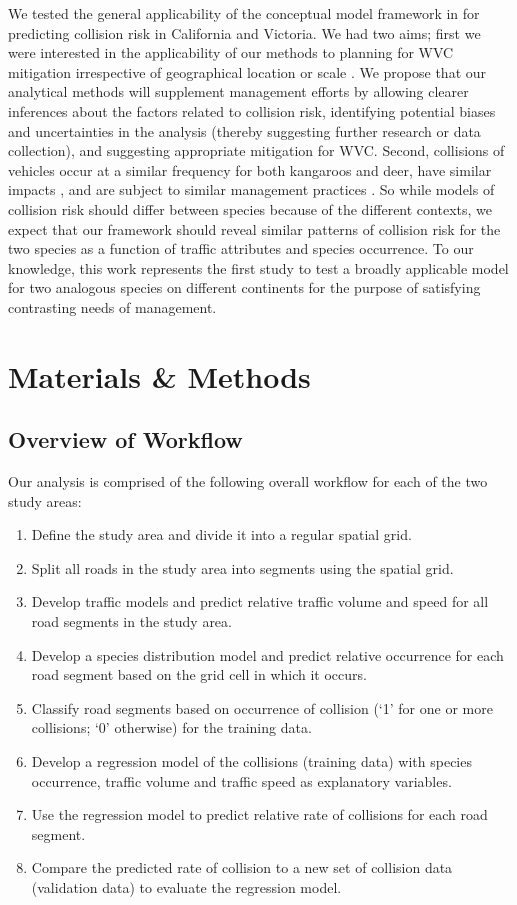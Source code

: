 We tested the general applicability of the conceptual model framework in  for predicting collision risk in California and Victoria.  We had two aims; first we were interested in the applicability of our methods to planning for WVC mitigation irrespective of geographical location or scale \citep[see][]{rvdr11}.  We propose that our analytical methods will supplement management efforts by allowing clearer inferences about the factors related to collision risk, identifying potential biases and uncertainties in the analysis (thereby suggesting further research or data collection), and suggesting appropriate mitigation for WVC.  Second, collisions of vehicles occur at a similar frequency for both kangaroos and deer, have similar impacts \citep{lang08}, and are subject to similar management practices \citep{mcsh97,crof04}.  So while models of collision risk should differ between species because of the different contexts, we expect that our framework should reveal similar patterns of collision risk for the two species as a function of traffic attributes and species occurrence.  To our knowledge, this work represents the first study to test a broadly applicable model for two analogous species on different continents for the purpose of satisfying contrasting needs of management.

\section{Materials \& Methods}

\subsection{Overview of Workflow}

Our analysis is comprised of the following overall workflow for each of the two study areas:

\begin{enumerate}
	\item Define the study area and divide it into a regular spatial grid.
	\item Split all roads in the study area into segments using the spatial grid.
	\item Develop traffic models and predict relative traffic volume and speed for all road segments in the study area.
	\item Develop a species distribution model and predict relative occurrence for each road segment based on the grid cell in which it occurs.
	\item Classify road segments based on occurrence of collision (`1' for one or more collisions; `0' otherwise) for the training data.
	\item Develop a regression model of the collisions (training data) with species occurrence, traffic volume and traffic speed as explanatory variables.
	\item Use the regression model to predict relative rate of collisions for each road segment.
	\item Compare the predicted rate of collision to a new set of collision data (validation data) to evaluate the regression model.
\end{enumerate}	

